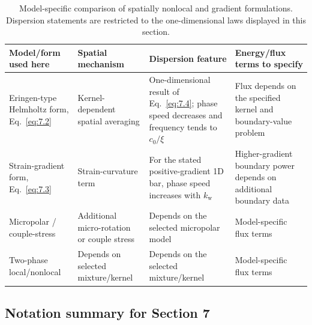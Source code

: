 \begin{table}[htbp]
\centering
\small
\caption{Model-specific comparison of spatially nonlocal and gradient formulations. Dispersion statements are restricted to the one-dimensional laws displayed in this section.}
\label{tab:nonlocal_comparison}
\begin{tabularx}{\textwidth}{@{}p{2.4cm}XXX@{}}
\toprule
\textbf{Model/form used here} & \textbf{Spatial mechanism} & \textbf{Dispersion feature} & \textbf{Energy/flux terms to specify} \\
\midrule
Eringen-type Helmholtz form, Eq.~\eqref{eq:7.2} & Kernel-dependent spatial averaging & One-dimensional result of Eq.~\eqref{eq:7.4}; phase speed decreases and frequency tends to $c_0/\xi$ & Flux depends on the specified kernel and boundary-value problem \\
Strain-gradient form, Eq.~\eqref{eq:7.3} & Strain-curvature term & For the stated positive-gradient 1D bar, phase speed increases with $k_{\mathrm w}$ & Higher-gradient boundary power depends on additional boundary data \\
Micropolar / couple-stress & Additional micro-rotation or couple stress & Depends on the selected micropolar model & Model-specific flux terms \\
Two-phase local/nonlocal & Depends on selected mixture/kernel & Depends on the selected mixture/kernel & Model-specific flux terms \\
\bottomrule
\end{tabularx}
\end{table}

\subsection{Notation summary for Section 7}

